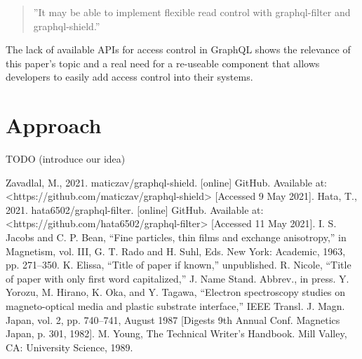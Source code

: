 \documentclass[conference]{IEEEtran}
\begin{document}
 \begin{quote} ''It may be able to implement flexible read control with graphql-filter and graphql-shield.'' \cite{b2}\newline
 \end{quote}

The lack of available APIs for access control in GraphQL shows the relevance of this paper's topic and a real need for a re-useable component that allows developers to easily add access control into their systems.

\section{Approach}\label{approach}

TODO (introduce our idea)

\begin{thebibliography}{00}
 Zavadlal, M., 2021. maticzav/graphql-shield. [online] GitHub. Available at: <https://github.com/maticzav/graphql-shield> [Accessed 9 May 2021].
 Hata, T., 2021. hata6502/graphql-filter. [online] GitHub. Available at: <https://github.com/hata6502/graphql-filter> [Accessed 11 May 2021].
 I. S. Jacobs and C. P. Bean, ``Fine particles, thin films and exchange anisotropy,'' in Magnetism, vol. III, G. T. Rado and H. Suhl, Eds. New York: Academic, 1963, pp. 271--350.
 K. Elissa, ``Title of paper if known,'' unpublished.
 R. Nicole, ``Title of paper with only first word capitalized,'' J. Name Stand. Abbrev., in press.
 Y. Yorozu, M. Hirano, K. Oka, and Y. Tagawa, ``Electron spectroscopy studies on magneto-optical media and plastic substrate interface,'' IEEE Transl. J. Magn. Japan, vol. 2, pp. 740--741, August 1987 [Digests 9th Annual Conf. Magnetics Japan, p. 301, 1982].
 M. Young, The Technical Writer's Handbook. Mill Valley, CA: University Science, 1989.
\end{thebibliography}
\end{document}

